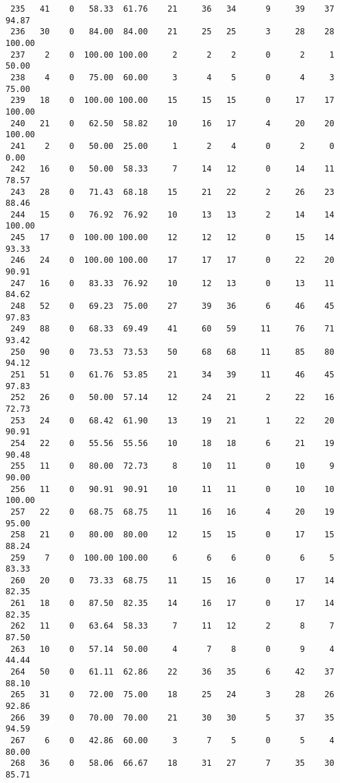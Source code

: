 \begin{verbatim}
 235   41    0   58.33  61.76    21     36   34      9     39    37    94.87
 236   30    0   84.00  84.00    21     25   25      3     28    28   100.00
 237    2    0  100.00 100.00     2      2    2      0      2     1    50.00
 238    4    0   75.00  60.00     3      4    5      0      4     3    75.00
 239   18    0  100.00 100.00    15     15   15      0     17    17   100.00
 240   21    0   62.50  58.82    10     16   17      4     20    20   100.00
 241    2    0   50.00  25.00     1      2    4      0      2     0     0.00
 242   16    0   50.00  58.33     7     14   12      0     14    11    78.57
 243   28    0   71.43  68.18    15     21   22      2     26    23    88.46
 244   15    0   76.92  76.92    10     13   13      2     14    14   100.00
 245   17    0  100.00 100.00    12     12   12      0     15    14    93.33
 246   24    0  100.00 100.00    17     17   17      0     22    20    90.91
 247   16    0   83.33  76.92    10     12   13      0     13    11    84.62
 248   52    0   69.23  75.00    27     39   36      6     46    45    97.83
 249   88    0   68.33  69.49    41     60   59     11     76    71    93.42
 250   90    0   73.53  73.53    50     68   68     11     85    80    94.12
 251   51    0   61.76  53.85    21     34   39     11     46    45    97.83
 252   26    0   50.00  57.14    12     24   21      2     22    16    72.73
 253   24    0   68.42  61.90    13     19   21      1     22    20    90.91
 254   22    0   55.56  55.56    10     18   18      6     21    19    90.48
 255   11    0   80.00  72.73     8     10   11      0     10     9    90.00
 256   11    0   90.91  90.91    10     11   11      0     10    10   100.00
 257   22    0   68.75  68.75    11     16   16      4     20    19    95.00
 258   21    0   80.00  80.00    12     15   15      0     17    15    88.24
 259    7    0  100.00 100.00     6      6    6      0      6     5    83.33
 260   20    0   73.33  68.75    11     15   16      0     17    14    82.35
 261   18    0   87.50  82.35    14     16   17      0     17    14    82.35
 262   11    0   63.64  58.33     7     11   12      2      8     7    87.50
 263   10    0   57.14  50.00     4      7    8      0      9     4    44.44
 264   50    0   61.11  62.86    22     36   35      6     42    37    88.10
 265   31    0   72.00  75.00    18     25   24      3     28    26    92.86
 266   39    0   70.00  70.00    21     30   30      5     37    35    94.59
 267    6    0   42.86  60.00     3      7    5      0      5     4    80.00
 268   36    0   58.06  66.67    18     31   27      7     35    30    85.71

\end{verbatim}
